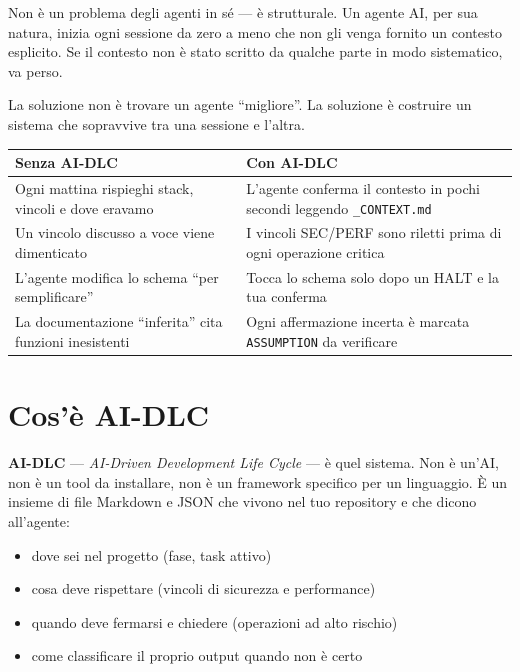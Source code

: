 Non è un problema degli agenti in sé --- è strutturale. Un agente AI, per sua natura, inizia ogni sessione da zero a meno che non gli venga fornito un contesto esplicito. Se il contesto non è stato scritto da qualche parte in modo sistematico, va perso.

La soluzione non è trovare un agente ``migliore''. La soluzione è costruire un sistema che sopravvive tra una sessione e l'altra.

\begin{beforeafterbox}
\begin{tabularx}{\linewidth}{@{}>{\raggedright\arraybackslash}X >{\raggedright\arraybackslash}X@{}}
\textbf{Senza AI-DLC} & \textbf{Con AI-DLC} \\
\midrule
Ogni mattina rispieghi stack, vincoli e dove eravamo & L'agente conferma il contesto in pochi secondi leggendo \texttt{\_CONTEXT.md} \\[3pt]
Un vincolo discusso a voce viene dimenticato & I vincoli SEC/PERF sono riletti prima di ogni operazione critica \\[3pt]
L'agente modifica lo schema ``per semplificare'' & Tocca lo schema solo dopo un HALT e la tua conferma \\[3pt]
La documentazione ``inferita'' cita funzioni inesistenti & Ogni affermazione incerta è marcata \texttt{ASSUMPTION} da verificare \\
\end{tabularx}
\end{beforeafterbox}

\section*{Cos'è AI-DLC}

\textbf{AI-DLC} --- \textit{AI-Driven Development Life Cycle} --- è quel sistema. Non è un'AI, non è un tool da installare, non è un framework specifico per un linguaggio. È un insieme di file Markdown e JSON che vivono nel tuo repository e che dicono all'agente:

\begin{itemize}
  \item dove sei nel progetto (fase, task attivo)
  \item cosa deve rispettare (vincoli di sicurezza e performance)
  \item quando deve fermarsi e chiedere (operazioni ad alto rischio)
  \item come classificare il proprio output quando non è certo
\end{itemize}

